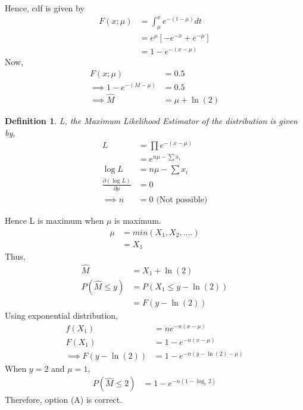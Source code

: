 \documentclass[]{article}
\newtheorem{definition}[problem]{Definition}
\theoremstyle{remark}
\begin{document}
Hence, cdf is given by
\begin{align}
F(x; \mu) &= \int_{\mu}^{x} e^{-(t-\mu)}dt\\ 
&= e^{\mu}[-e^{-x} + e^{-\mu}]\\
&= 1 - e^{-(x-\mu)}
\end{align}
Now,
\begin{align}
F(x; \mu) &= 0.5\\
\implies 1 - e^{-(M-\mu)} &= 0.5\\
\implies \hat{M} &= \mu + \ln(2)
\end{align}
\begin{definition}
L, the Maximum Likelihood Estimator of the distribution is given by,
\begin{align}
L &= \prod e^{-(x-\mu)}\\
&= e^{n\mu-\sum x_i}\\
\log L &= n\mu - \sum x_i\\
\frac{\partial {(\log L)}}{\partial \mu} &= 0\\
\implies n &= 0 \text{ (Not possible)}
\end{align}
\end{definition}
Hence L is maximum when $\mu$ is maximum.
\begin{align}
\mu &= min(X_1, X_2,....)\\
&= X_1 
\end{align}
Thus,
\begin{align}
\hat{M} &= X_1 + \ln(2)\\
P(\hat{M} \leq y) &= P(X_1 \leq y-\ln(2))\\
&= F(y-\ln(2))
\end{align}
Using exponential distribution,
\begin{align}
f(X_1) &= ne^{-n(x-\mu)}\\
F(X_1) &= 1-e^{-n(x-\mu)}\\
\implies F(y-\ln(2)) &= 1-e^{-n(y-\ln(2)-\mu)}
\end{align}
When $y = 2$ and $\mu = 1$,
\begin{align}
P(\hat{M} \leq 2) &= 1 - e^{-n(1 - \log_e 2)}
\end{align}
Therefore, option (A) is correct.
\end{document}
